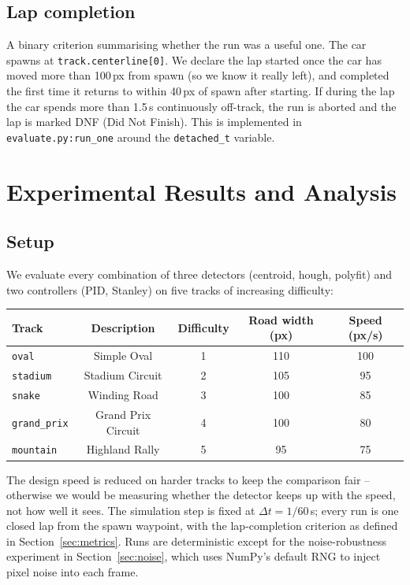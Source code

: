 \subsection{Lap completion}

A binary criterion summarising whether the run was a useful one. The
car spawns at \texttt{track.centerline[0]}. We declare the lap
started once the car has moved more than 100\,px from spawn (so we
know it really left), and completed the first time it returns to
within 40\,px of spawn after starting. If during the lap the car
spends more than 1.5\,s continuously off-track, the run is aborted
and the lap is marked DNF (Did Not Finish). This is implemented in
\texttt{evaluate.py:run\_one} around the \texttt{detached\_t}
variable.

\section{Experimental Results and Analysis}
\label{sec:results}

\subsection{Setup}

We evaluate every combination of three detectors (centroid, hough,
polyfit) and two controllers (PID, Stanley) on five tracks of
increasing difficulty:
\begin{center}
\begin{tabular}{lcccc}
\toprule
Track & Description & Difficulty & Road width (px) & Speed (px/s) \\
\midrule
\texttt{oval}        & Simple Oval         & 1 & 110 & 100 \\
\texttt{stadium}     & Stadium Circuit     & 2 & 105 & 95 \\
\texttt{snake}       & Winding Road        & 3 & 100 & 85 \\
\texttt{grand\_prix} & Grand Prix Circuit  & 4 & 100 & 80 \\
\texttt{mountain}    & Highland Rally      & 5 & 95  & 75 \\
\bottomrule
\end{tabular}
\end{center}

The design speed is reduced on harder tracks to keep the comparison
fair -- otherwise we would be measuring whether the detector keeps up
with the speed, not how well it sees. The simulation step is fixed at
$\Delta t = 1/60$\,s; every run is one closed lap from the spawn
waypoint, with the lap-completion criterion as defined in
Section~\ref{sec:metrics}. Runs are deterministic except for the
noise-robustness experiment in Section~\ref{sec:noise}, which uses
NumPy's default RNG to inject pixel noise into each frame.

